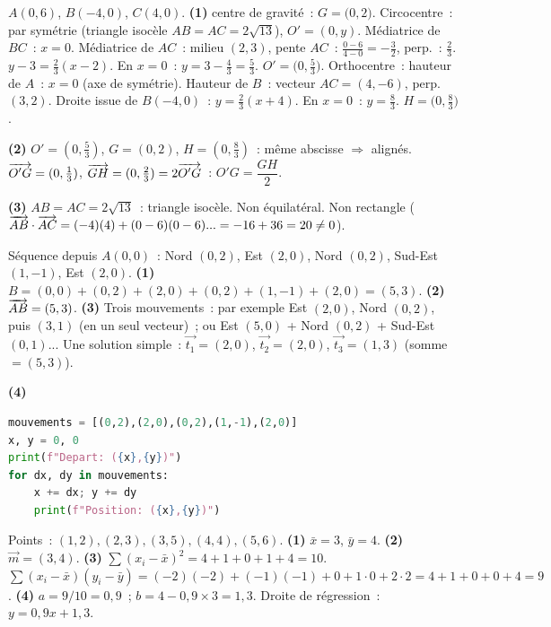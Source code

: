 $A(0,6)$, $B(-4,0)$, $C(4,0)$.
\textbf{(1)} centre de gravité~: $G=\bigl(0,2\bigr)$.
Circocentre~: par sym\'etrie (triangle isoc\`ele $AB=AC=2\sqrt{13}$), $O'=(0,y)$.
M\'ediatrice de $BC$~: $x=0$. M\'ediatrice de $AC$~: milieu $(2,3)$, pente $AC$~: $\frac{0-6}{4-0}=-\frac{3}{2}$, perp.~: $\frac{2}{3}$.
$y-3=\frac{2}{3}(x-2)$. En $x=0$~: $y=3-\frac{4}{3}=\frac{5}{3}$.
$O'=\bigl(0,\frac{5}{3}\bigr)$.
Orthocentre~: hauteur de $A$~: $x=0$ (axe de sym\'etrie). Hauteur de $B$~: vecteur $AC=(4,-6)$, perp. $(3,2)$. Droite issue de $B(-4,0)$~: $y=\frac{2}{3}(x+4)$. En $x=0$~: $y=\frac{8}{3}$.
$H=\bigl(0,\frac{8}{3}\bigr)$.

\textbf{(2)} $O'=(0,\frac{5}{3})$, $G=(0,2)$, $H=(0,\frac{8}{3})$~: m\^eme abscisse $\Rightarrow$ align\'es.\checkmark
$\overrightarrow{O'G}=(0,\frac{1}{3})$, $\overrightarrow{GH}=(0,\frac{2}{3})=2\overrightarrow{O'G}$~:
$O'G=\dfrac{GH}{2}$.\checkmark

\textbf{(3)} $AB=AC=2\sqrt{13}$~: triangle isoc\`ele. Non \'equilat\'eral. Non rectangle
($\overrightarrow{AB}\cdot\overrightarrow{AC}=(-4)(4)+(0-6)(0-6)... = -16+36=20\ne0$).


S\'equence depuis $A(0,0)$~: Nord $(0,2)$, Est $(2,0)$, Nord $(0,2)$, Sud-Est $(1,-1)$, Est $(2,0)$.
\textbf{(1)} $B=(0,0)+(0,2)+(2,0)+(0,2)+(1,-1)+(2,0)=(5,3)$.
\textbf{(2)} $\overrightarrow{AB}=(5,3)$.
\textbf{(3)} Trois mouvements~: par exemple Est $(2,0)$, Nord $(0,2)$, puis $(3,1)$ (en un seul vecteur)~;
ou Est $(5,0)$ + Nord $(0,2)$ + Sud-Est $(0,1)$... Une solution simple~:
$\vec{t_1}=(2,0)$, $\vec{t_2}=(2,0)$, $\vec{t_3}=(1,3)$ (somme $=(5,3)$).\checkmark

\textbf{(4)}
\begin{lstlisting}[language=Python]
mouvements = [(0,2),(2,0),(0,2),(1,-1),(2,0)]
x, y = 0, 0
print(f"Depart: ({x},{y})")
for dx, dy in mouvements:
    x += dx; y += dy
    print(f"Position: ({x},{y})")
\end{lstlisting}


Points~: $(1,2),(2,3),(3,5),(4,4),(5,6)$.
\textbf{(1)} $\bar{x}=3$, $\bar{y}=4$.
\textbf{(2)} $\vec{m}=(3,4)$.
\textbf{(3)} $\sum(x_i-\bar{x})^2=4+1+0+1+4=10$.
$\sum(x_i-\bar{x})(y_i-\bar{y})=(-2)(-2)+(-1)(-1)+0+1\cdot0+2\cdot2=4+1+0+0+4=9$.
\textbf{(4)} $a=9/10=0{,}9$~; $b=4-0{,}9\times3=1{,}3$.
Droite de r\'egression~: $y=0{,}9x+1{,}3$.

